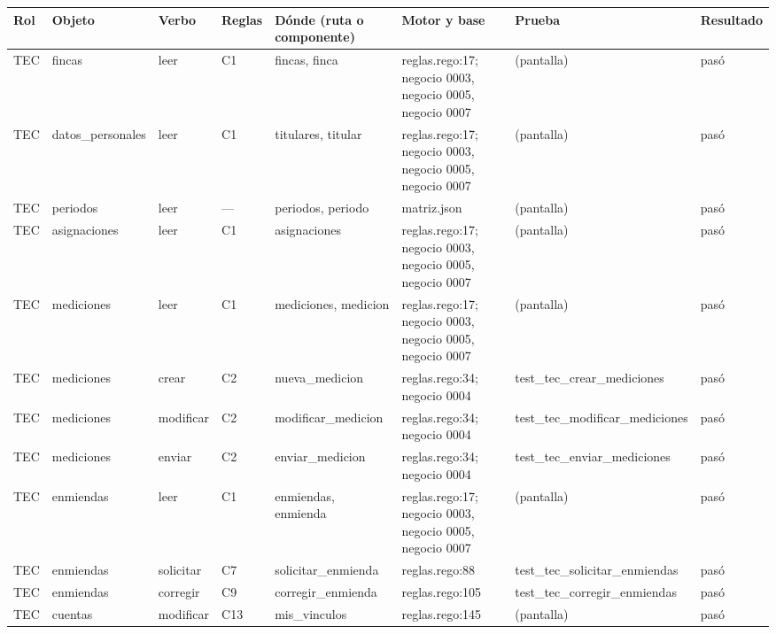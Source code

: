 \documentclass[11pt,letterpaper]{article}
\newcommand{\cab}[1]{\textbf{\rmfamily #1}}
\begin{document}
\begin{center}
\scriptsize
\renewcommand{\arraystretch}{1.05}
\setlength{\tabcolsep}{3pt}
\begin{longtable}{@{}p{0.6cm} p{1.7cm} p{1.2cm} p{0.9cm} p{3.4cm} p{2.6cm} p{3.4cm} p{0.8cm}@{}}
\toprule
\cab{Rol} & \cab{Objeto} & \cab{Verbo} & \cab{Reglas} & \cab{Dónde (ruta o componente)} & \cab{Motor y base} & \cab{Prueba} & \cab{Resultado} \\
\midrule
\endhead
TEC & fincas & leer & C1 & fincas, \allowbreak{}finca & reglas.rego:17; negocio 0003, negocio 0005, negocio 0007 & (pantalla) & pasó \\
TEC & datos\_\allowbreak{}personales & leer & C1 & titulares, \allowbreak{}titular & reglas.rego:17; negocio 0003, negocio 0005, negocio 0007 & (pantalla) & pasó \\
TEC & periodos & leer & — & periodos, \allowbreak{}periodo & matriz.json & (pantalla) & pasó \\
TEC & asignaciones & leer & C1 & asignaciones & reglas.rego:17; negocio 0003, negocio 0005, negocio 0007 & (pantalla) & pasó \\
TEC & mediciones & leer & C1 & mediciones, \allowbreak{}medicion & reglas.rego:17; negocio 0003, negocio 0005, negocio 0007 & (pantalla) & pasó \\
TEC & mediciones & crear & C2 & nueva\_medicion & reglas.rego:34; negocio 0004 & test\_\allowbreak{}tec\_\allowbreak{}crear\_\allowbreak{}mediciones & pasó \\
TEC & mediciones & modificar & C2 & modificar\_medicion & reglas.rego:34; negocio 0004 & test\_\allowbreak{}tec\_\allowbreak{}modificar\_\allowbreak{}mediciones & pasó \\
TEC & mediciones & enviar & C2 & enviar\_medicion & reglas.rego:34; negocio 0004 & test\_\allowbreak{}tec\_\allowbreak{}enviar\_\allowbreak{}mediciones & pasó \\
TEC & enmiendas & leer & C1 & enmiendas, \allowbreak{}enmienda & reglas.rego:17; negocio 0003, negocio 0005, negocio 0007 & (pantalla) & pasó \\
TEC & enmiendas & solicitar & C7 & solicitar\_enmienda & reglas.rego:88 & test\_\allowbreak{}tec\_\allowbreak{}solicitar\_\allowbreak{}enmiendas & pasó \\
TEC & enmiendas & corregir & C9 & corregir\_enmienda & reglas.rego:105 & test\_\allowbreak{}tec\_\allowbreak{}corregir\_\allowbreak{}enmiendas & pasó \\
TEC & cuentas & modificar & C13 & mis\_vinculos & reglas.rego:145 & (pantalla) & pasó \\

\end{longtable}
\end{center}
\end{document}
